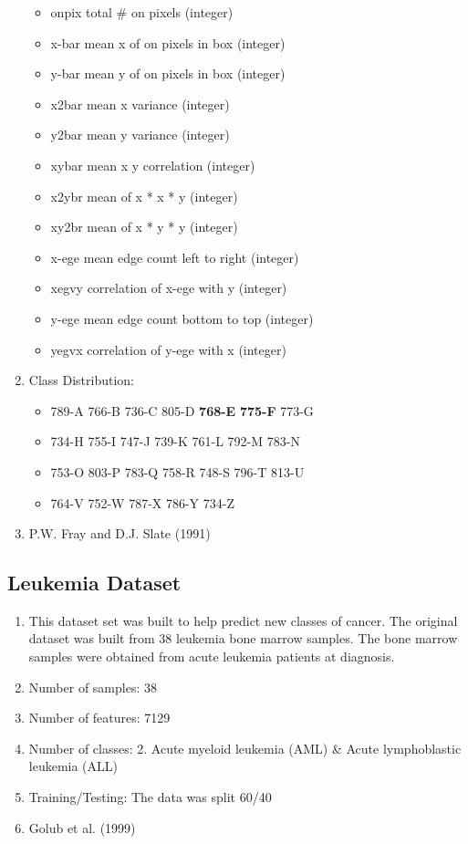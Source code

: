 \documentclass[letterpaper, 11pt]{article}
\begin{document}
\begin{enumerate}
\begin{itemize}
        \item onpix	total \# on pixels		      (integer)
        \item x-bar	mean x of on pixels in box	  (integer)
        \item y-bar	mean y of on pixels in box	  (integer)
        \item x2bar	mean x variance			      (integer)
        \item y2bar	mean y variance			      (integer)
        \item xybar	mean x y correlation		  (integer)
        \item x2ybr	mean of x * x * y		      (integer)
        \item xy2br	mean of x * y * y		      (integer)
        \item x-ege	mean edge count left to right (integer)
        \item xegvy	correlation of x-ege with y	  (integer)
        \item y-ege	mean edge count bottom to top (integer)
        \item yegvx	correlation of y-ege with x	  (integer)
    \end{itemize}
    \item Class Distribution:
    \begin{itemize}
        \item 789-A 766-B 736-C 805-D \textbf{768-E} \textbf{775-F} 773-G
        \item 734-H 755-I 747-J 739-K 761-L 792-M 783-N
        \item 753-O 803-P 783-Q 758-R 748-S 796-T 813-U
        \item 764-V 752-W 787-X 786-Y 734-Z
    \end{itemize}
    \item P.W. Fray and D.J. Slate (1991)
\end{enumerate}

\subsection{Leukemia Dataset}
\begin{enumerate}
    \item This dataset set was built to help predict new classes of cancer. The original dataset was built from 38 leukemia bone marrow samples. The bone marrow samples were obtained from acute leukemia patients at diagnosis.
    \item Number of samples: 38
    \item Number of features: 7129
    \item Number of classes: 2. Acute myeloid leukemia (AML) \& Acute lymphoblastic leukemia (ALL)
    \item Training/Testing: The data was split 60/40
    \item Golub et al. (1999)
\end{enumerate}
\end{document}
